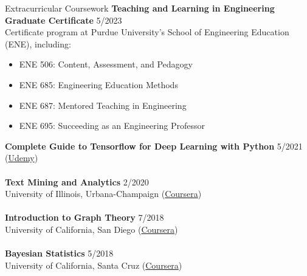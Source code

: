 \documentclass{CV} %
\begin{document}
\begin{rSection}{Extracurricular Coursework}
    \textbf{Teaching and Learning in Engineering Graduate Certificate} \hfill{5/2023}
    \\ Certificate program at Purdue University's School of Engineering Education (ENE), including:
    \begin{itemize}
        \item ENE 506: Content, Assessment, and Pedagogy
        \item ENE 685: Engineering Education Methods
        \item ENE 687: Mentored Teaching in Engineering
        \item ENE 695: Succeeding as an Engineering Professor
    \end{itemize}
    \textbf{Complete Guide to Tensorflow for Deep Learning with Python} \hfill 5/2021
    \\ (\href{https://www.udemy.com/certificate/UC-caa1f4ed-6be6-4b50-9bd1-1b57ab7c196a}{Udemy}) \\
    \\ \textbf{Text Mining and Analytics} \hfill 2/2020
    \\ University of Illinois, Urbana-Champaign (\href{https://coursera.org/share/7eac25e880771bf576b661324a4d79be}{Coursera}) \\
    \\ \textbf{Introduction to Graph Theory} \hfill 7/2018
    \\ University of California, San Diego (\href{https://coursera.org/share/97583460aa0510f570f971844f19d16b}{Coursera}) \\
    \\ \textbf{Bayesian Statistics} \hfill 5/2018
    \\ University of California, Santa Cruz (\href{https://coursera.org/share/8d0b0387400c53f13a7ce2b2b81153fc}{Coursera}) 
\end{rSection}
\end{document}
